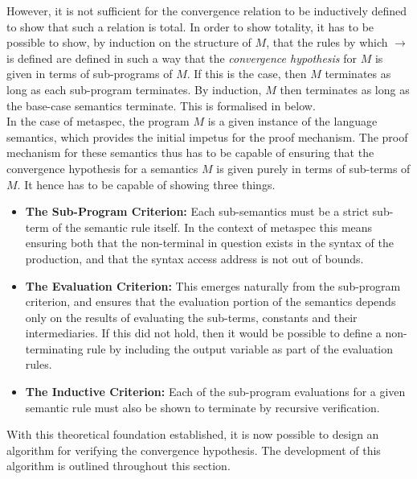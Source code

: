 However, it is not sufficient for the convergence relation to be inductively defined to show that such a relation is total. 
In order to show totality, it has to be possible to show, by induction on the structure of $M$, that the rules by which $\to$ is defined are defined in such a way that the \textit{convergence hypothesis} for $M$ is given in terms of sub-programs of $M$.
If this is the case, then $M$ terminates as long as each sub-program terminates.
By induction, $M$ then terminates as long as the base-case semantics terminate.
This is formalised in  below.\\

In the case of \gls{metaspec}, the program $M$ is a given instance of the language semantics, which provides the initial impetus for the proof mechanism. 
The proof mechanism for these semantics thus has to be capable of ensuring that the convergence hypothesis for a semantics $M$ is given purely in terms of sub-terms of $M$. 
It hence has to be capable of showing three things.
\begin{itemize}
    \item \textbf{The Sub-Program Criterion:} Each sub-semantics must be a strict sub-term of the semantic rule itself. 
    In the context of \gls{metaspec} this means ensuring both that the non-terminal in question exists in the syntax of the production, and that the syntax access address is not out of bounds. 
    \item \textbf{The Evaluation Criterion:} This emerges naturally from the sub-program criterion, and ensures that the evaluation portion of the semantics depends only on the results of evaluating the sub-terms, constants and their intermediaries. 
    If this did not hold, then it would be possible to define a non-terminating rule by including the output variable as part of the evaluation rules. 
    \item \textbf{The Inductive Criterion:} Each of the sub-program evaluations for a given semantic rule must also be shown to terminate by recursive verification.
\end{itemize}

With this theoretical foundation established, it is now possible to design an algorithm for verifying the convergence hypothesis.
The development of this algorithm is outlined throughout this section.

